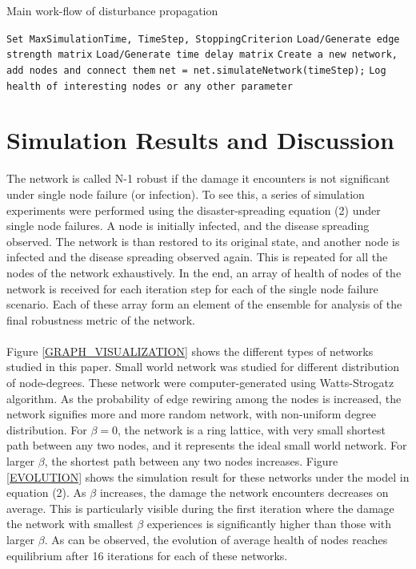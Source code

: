 \documentclass[11pt]{article}
\begin{document}
\begin{algorithm}
\caption{Main work-flow of disturbance propagation}\label{MAIN_PSEUDO_CODE}
\begin{algorithmic}[1]
			\State \texttt{Set MaxSimulationTime, TimeStep, StoppingCriterion}
			\State \texttt{Load/Generate edge strength matrix}
			\State \texttt{Load/Generate time delay matrix}
			\State \texttt{Create a new network, add nodes and connect them}
	\EndProcedure
			\State \texttt{net = net.simulateNetwork(timeStep);}
			\State \texttt{Log health of interesting nodes or any other parameter}
		\EndWhile
	\EndProcedure
\EndProcedure
\end{algorithmic}
\end{algorithm}

\newpage
\section{Simulation Results and Discussion}
The network is called N-1 robust if the damage it encounters is not significant under single node failure (or infection).  To see this, a series of simulation experiments were performed using the disaster-spreading equation (2) under single node failures. A node is initially infected, and the disease spreading observed. The network is than restored to its original state, and another node is infected and the disease spreading observed again. This is repeated for all the nodes of the network exhaustively. In the end, an array of health of nodes of the network is received for each iteration step for each of the single node failure scenario. Each of these array form an element of the ensemble for analysis of the final robustness metric of the network. \\
\\
Figure \ref{GRAPH_VISUALIZATION} shows the different types of networks studied in this paper. Small world network was studied for different distribution of node-degrees. These network were computer-generated using Watts-Strogatz algorithm. As the probability of edge rewiring among the nodes is increased, the network signifies more and more random network, with non-uniform degree distribution. For $\beta=0$, the network is a ring lattice, with very small shortest path between any two nodes, and it represents the ideal small world network. For larger $\beta$, the shortest path between any two nodes increases. Figure \ref{EVOLUTION} shows the simulation result for these networks under the model in equation (2). As $\beta$ increases, the damage the network encounters decreases on average. This is particularly visible during the first iteration where the damage the network with smallest $\beta$ experiences is significantly higher than those with larger $\beta$. As can be observed, the evolution of average health of nodes reaches equilibrium after 16 iterations for each of these networks. 
\end{document}

